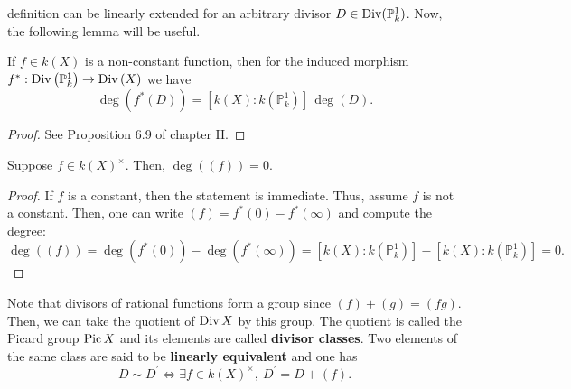 definition can be linearly extended for an arbitrary divisor
$D\in\operatorname{Div}(\mathbb{P}^{1}_{k})$. Now, the following lemma will be useful.
\begin{lemm}\label{lemm:deg_of_induced}
  If $f\in k(X)$ is a non-constant function, then for the induced morphism
  $f^{\ast}:\operatorname{Div}\left(\mathbb{P}^{1}_{k}\right)\to\operatorname{Div}\left(X\right)$ we have
  \[
    \deg\left(f^{\ast}(D)\right)=[k(X):k(\mathbb{P}^{1}_{k})]\,\deg(D).
  \]
\end{lemm}
\begin{proof}
  See Proposition 6.9 of \cite{hartshorne} chapter II.
\end{proof}
\begin{cor}\label{cor:rational_deg_zero}
  Suppose $f\in k(X)^{\times}$. Then, $\deg\left((f)\right)=0$.
\end{cor}
\begin{proof}
  If $f$ is a constant, then the statement is immediate. Thus, assume
  $f$ is not a constant. Then, one can write
  $(f)=f^{\ast}(0)-f^{\ast}(\infty)$ and compute the degree:
  \[
    \deg\left((f)\right)=\deg(f^{\ast}(0))-\deg(f^{\ast}(\infty))
    =[k(X):k(\mathbb{P}^{1}_{k})]-[k(X):k(\mathbb{P}^{1}_{k})]=0.
  \]
\end{proof}
\begin{rem}
  Note that divisors of rational functions form a group since
  $(f)+(g)=(fg)$. Then, we can take the quotient of $\operatorname{Div} X$ by this group.
  The quotient is called the Picard group $\operatorname{Pic} X$ and its elements are
  called \textbf{divisor classes}. Two elements of the same class are
  said to be \textbf{linearly equivalent} and one has
  \[
    D\sim D^{\prime}\iff \exists f\in k(X)^{\times},\ D^{\prime}=D+(f).
  \]
\end{rem}

